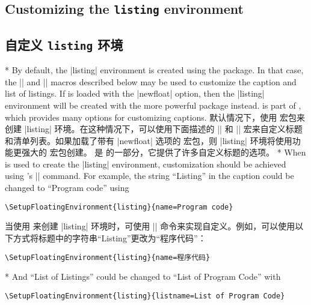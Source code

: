 \begin{paracol}{2}
\subsection*{Customizing the \texttt{listing} environment}
\switchcolumn
\subsection*{自定义 \texttt{listing} 环境}
\switchcolumn[0]*%
By default, the |listing| environment is created using the  package.  In that case, the |\listingscaption| and |\listoflistingscaption| macros described below may be used to customize the caption and list of listings.  If  is loaded with the |newfloat| option, then the |listing| environment will be created with the more powerful \href{http://www.ctan.org/pkg/newfloat}{} package instead.   is part of \href{http://www.ctan.org/pkg/caption}{}, which provides many options for customizing captions.
\switchcolumn
默认情况下，使用  宏包来创建 |listing| 环境。在这种情况下，可以使用下面描述的 |\listingscaption| 和 |\listoflistingscaption| 宏来自定义标题和清单列表。如果加载了带有 |newfloat| 选项的  宏包，则 |listing| 环境将使用功能更强大的 \href{http://www.ctan.org/pkg/newfloat}{} 宏包创建。  是 \href{http://www.ctan.org/pkg/caption}{} 的一部分，它提供了许多自定义标题的选项。
\switchcolumn[0]*%
When  is used to create the |listing| environment, customization should be achieved using 's |\SetupFloatingEnvironment| command.  For example, the string ``Listing'' in the caption could be changed to ``Program code'' using 
\begin{verbatim}
\SetupFloatingEnvironment{listing}{name=Program code}
\end{verbatim}
\switchcolumn
当使用  来创建 |listing| 环境时，可使用 |\SetupFloatingEnvironment| 命令来实现自定义。例如，可以使用以下方式将标题中的字符串“Listing”更改为“程序代码”：
\begin{verbatim}
\SetupFloatingEnvironment{listing}{name=程序代码}
\end{verbatim}
\switchcolumn[0]*%
And ``List of Listings'' could be changed to ``List of Program Code'' with 
\begin{verbatim}
\SetupFloatingEnvironment{listing}{listname=List of Program Code}
\end{verbatim}

\end{paracol}
